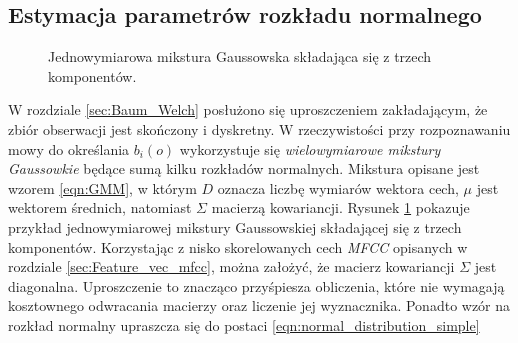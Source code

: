 \documentclass[shortabstract, mgr]{iithesis}
\begin{document}
	   \subsection{Estymacja parametrów rozkładu normalnego}
	   	   
	   \begin{figure}[H]
	   \label{fig:gmm}
	   \caption{Jednowymiarowa mikstura Gaussowska składająca się z trzech komponentów.}
	\end{figure}
	   
	   \label{sec:gmm_estimation}
	   W rozdziale \ref{sec:Baum_Welch} posłużono się uproszczeniem zakładającym, że zbiór obserwacji jest skończony i dyskretny. W rzeczywistości przy rozpoznawaniu mowy do określania $b_i(o)$ wykorzystuje się \textit{wielowymiarowe mikstury Gaussowkie} będące sumą kilku rozkładów normalnych. Mikstura opisane jest wzorem \ref{eqn:GMM}, w którym $D$ oznacza liczbę wymiarów wektora cech, $\mu$ jest wektorem średnich, natomiast $\Sigma$ macierzą kowariancji. Rysunek \ref{fig:gmm} pokazuje przykład jednowymiarowej mikstury Gaussowskiej składającej się z trzech komponentów. Korzystając z nisko skorelowanych cech \textit{MFCC} opisanych w rozdziale \ref{sec:Feature_vec_mfcc}, można założyć, że macierz kowariancji $\Sigma$ jest diagonalna. Uproszczenie to znacząco przyśpiesza obliczenia, które nie wymagają kosztownego odwracania macierzy oraz liczenie jej wyznacznika. Ponadto wzór na rozkład normalny upraszcza się do postaci \ref{eqn:normal_distribution_simple}
	   
\end{document}
